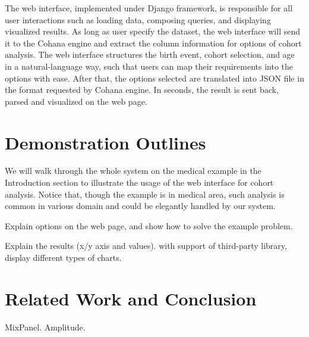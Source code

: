 \documentclass[10pt,conference,letterpaper]{IEEEtran}
\begin{document}
The web interface, implemented under Django framework, is responsible for all user interactions such as loading data, composing queries, and displaying visualized results. As long as user specify the dataset, the web interface will send it to the Cohana engine and extract the column information for options of cohort analysis. The web interface structures the birth event, cohort selection, and age in a natural-language way, such that users can map their requirements into the options with ease. After that, the options selected are translated into JSON file in the format requested by Cohana engine. In seconds, the result is sent back, parsed and visualized on the web page.

\section{Demonstration Outlines}

We will walk through the whole system on the medical example in the Introduction section to illustrate the usage of the web interface for cohort analysis. Notice that, though the example is in medical area, such analysis is common in various domain and could be elegantly handled by our system.




Explain options on the web page, and show how to solve the example problem.

Explain the results (x/y axis and values). with support of third-party library, display different types of charts.

\section{Related Work and Conclusion}

MixPanel. Amplitude. 







\end{document}
